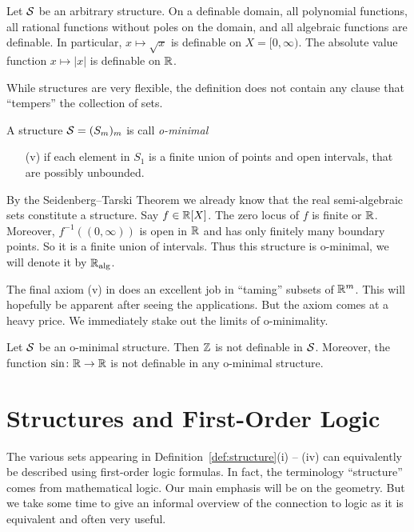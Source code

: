 \begin{example}
  Let ${\mathcal S}$ be an arbitrary structure. 
  On a definable domain, 
  all polynomial functions, all rational functions without poles on the
  domain, and all algebraic functions are definable.
  In particular, $x\mapsto \sqrt{x}$ is definable on $X=[0,\infty)$.
  The absolute value function $x\mapsto |x|$ is definable on ${\mathbb{R}}$.
\end{example}



While structures are very flexible, the definition does not contain
any clause that ``tempers'' the collection of sets.

\begin{definition}
  A {structure} ${\mathcal S}=(S_m)_m$ is call \emph{o-minimal}
  \begin{enumerate}
  \item [(v)]  if each 
  element in $S_1$ is a finite union of points and
  open intervals, that are possibly unbounded.
  \end{enumerate}
\end{definition}

\begin{example}
  By the Seidenberg--Tarski Theorem we already know that the real
  semi-algebraic sets constitute a structure. Say $f\in{\mathbb{R}}[X]$.
  The zero locus of $f$ is finite or ${\mathbb{R}}$. Moreover,
  $f^{-1}((0,\infty))$ is open in ${\mathbb{R}}$ and has only finitely many
  boundary points. So it is a finite union of intervals. Thus this
  structure is o-minimal, we will denote it by ${\mathbb{R}}_{\mathrm{alg}}$. 
\end{example}

The final axiom (v) in does an excellent job in ``taming'' subsets of
${\mathbb{R}}^m$. This will hopefully be apparent after seeing the
applications. But the axiom comes at a heavy price.
We immediately stake out the limits of o-minimality.

\begin{nonexample}
  Let ${\mathcal S}$ be an o-minimal structure. Then ${\mathbb{Z}}$ is not definable in
  ${\mathcal S}$. Moreover, the function $\sin \colon{\mathbb{R}}\rightarrow{\mathbb{R}}$
  is not definable in any o-minimal structure.  
\end{nonexample}

\section{Structures and First-Order Logic}

The various sets appearing in Definition~\ref{def:structure}(i) --
(iv) can equivalently be described using first-order logic formulas. In fact, the
terminology ``structure'' comes from mathematical logic. Our main
emphasis will be on the geometry.  But we  take some time to give
an informal overview of the connection to logic as it is equivalent
and often very useful. 


